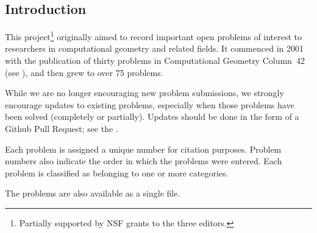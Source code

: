 \subsection{Introduction}
This project\footnote{Partially supported by NSF grants to the three editors.} 
originally aimed to record important open problems
of interest to researchers in computational geometry and
related fields.  It commenced in 2001 with the publication of
thirty problems in Computational Geometry Column~42~\cite{mo-cgc42-01}
(see ),
and then grew to over 75 problems.

While we are no longer encouraging new problem submissions, we strongly
encourage updates to existing problems, especially when those problems have
been solved (completely or partially).
Updates should be done in the form of a Github Pull Request;
see the .

Each problem is assigned a unique number for citation purposes.
Problem numbers also indicate the order in which the problems were entered.
Each problem is classified as belonging to one or more categories.

The problems are also available as a single
file.

